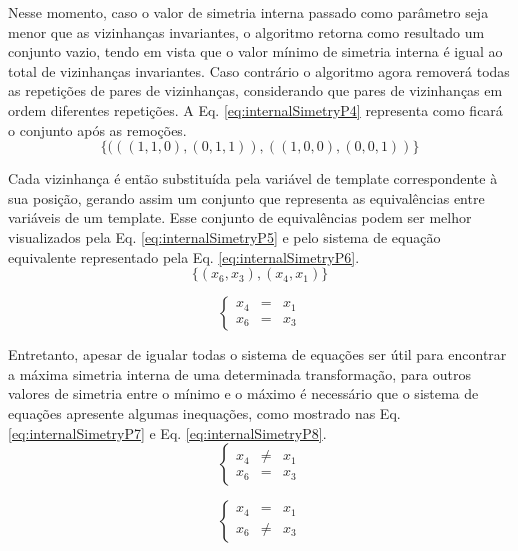 Nesse momento, caso o valor de simetria interna passado como parâmetro seja menor que as vizinhanças invariantes, o algoritmo retorna como resultado um conjunto vazio, tendo em vista que o valor mínimo de simetria interna é igual ao total de vizinhanças invariantes. Caso contrário o algoritmo agora removerá todas as repetições de pares de vizinhanças, considerando que pares de vizinhanças em ordem diferentes repetições. A Eq. \eqref{eq:internalSimetryP4} representa como ficará o conjunto após as remoções.
\begin{equation}
\{(((1,1,0),(0,1,1)), ((1,0,0),(0,0,1))\}
\label{eq:internalSimetryP4}
\end{equation}

Cada vizinhança é então substituída pela variável de template correspondente à sua posição, gerando assim um conjunto que representa as equivalências entre variáveis de um template. Esse conjunto de equivalências podem ser melhor visualizados pela Eq. \eqref{eq:internalSimetryP5} e pelo sistema de equação equivalente representado pela Eq. \eqref{eq:internalSimetryP6}.
\begin{equation}
\{(x_6,x_3), (x_4,x_1)\}
\label{eq:internalSimetryP5}
\end{equation}

\begin{equation}
\left\{\begin{matrix}
x_4 & = & x_1\\ 
x_6 & = & x_3
\end{matrix}\right.
\label{eq:internalSimetryP6}
\end{equation}

Entretanto, apesar de igualar todas o sistema de equações ser útil para encontrar a máxima simetria interna de uma determinada transformação, para outros valores de simetria entre o mínimo e o máximo é necessário que o sistema de equações apresente algumas inequações, como mostrado nas Eq. \eqref{eq:internalSimetryP7} e Eq. \eqref{eq:internalSimetryP8}.
\begin{equation}
\left\{\begin{matrix}
x_4 & \neq & x_1\\ 
x_6 & = & x_3
\end{matrix}\right.
\label{eq:internalSimetryP7}
\end{equation}

\begin{equation}
\left\{\begin{matrix}
x_4 & = & x_1\\ 
x_6 & \neq & x_3
\end{matrix}\right.
\label{eq:internalSimetryP8}
\end{equation}

